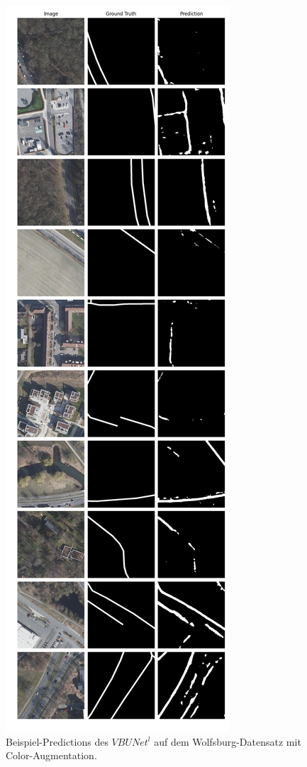\begin{figure}
	\centering
	\includegraphics[width=.41\textwidth]{Bilder/wolfsburg-color-samples/vbunet-l.png}
	\caption{Beispiel-Predictions des $VBUNet^l$ auf dem Wolfsburg-Datensatz mit Color-Augmentation.}
	\label{fig:wolfsburg-color-samples-vbunet-l}
\end{figure}

